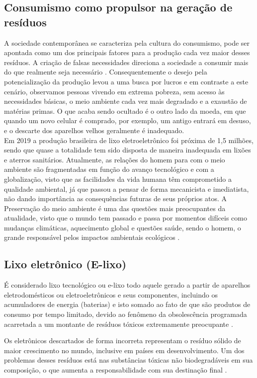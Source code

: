 \documentclass[
	12pt,				%
	openany,			%
	twoside,			%
	a4paper,			%
	english,			%
	french,				%
	spanish,			%
	brazil				%
	]{abntex2}
\begin{document}
\subsection{Consumismo como propulsor na geração de resíduos}
A sociedade contemporânea se caracteriza pela cultura do consumismo, pode ser apontada como um dos principais fatores para a produção cada vez maior desses resíduos. A criação de falsas necessidades direciona a sociedade a consumir mais do que realmente seja necessário \cite{vbd}.
Consequentemente o desejo pela potencialização da produção levou a uma busca por lucros e em contraste a este cenário, observamos pessoas vivendo em extrema pobreza, sem acesso às necessidades básicas, o meio ambiente cada vez mais degradado e a exaustão de matérias primas. O que acaba sendo ocultado é o outro lado da moeda, em que quando um novo celular é comprado, por exemplo, um antigo entrará em desuso, e o descarte dos aparelhos velhos geralmente é inadequado.
\\
Em 2019 a produção brasileira de lixo eletroeletrônico foi próxima de 1,5 milhões, sendo que quase a totalidade tem sido disposta de maneira inadequada em lixões e aterros sanitários.
Atualmente, as relações do homem para com o meio ambiente são fragmentadas em função do avanço tecnológico e com a globalização, visto que as facilidades da vida humana têm comprometido a qualidade ambiental, já que passou a pensar de forma mecanicista e imediatista, não dando importância as consequências futuras de seus próprios atos. A Preservação do meio ambiente é uma das questões mais preocupantes da atualidade, visto que o mundo tem passado e passa por momentos difíceis como mudanças climáticas, aquecimento global e questões saúde, sendo o homem, o grande responsável pelos impactos ambientais ecológicos \cite{ess}.

\subsection{Lixo eletrônico (E-lixo)}
É considerado lixo tecnológico ou e-lixo todo aquele gerado a partir de aparelhos eletrodomésticos ou eletroeletrônicos e seus componentes, incluindo os acumuladores de energia (baterias) e isto somado ao fato de que são produtos de consumo por tempo limitado, devido ao fenômeno da obsolescência programada acarretada a um montante de resíduos tóxicos extremamente preocupante \cite{edbasica}.


Os eletrônicos descartados de forma incorreta representam o resíduo sólido de maior crescimento no mundo, inclusive em países em desenvolvimento. Um dos problemas desses resíduos está nas substâncias tóxicas não biodegradáveis em sua composição, o que aumenta a responsabilidade com sua destinação final \cite{vbd}.
\end{document}
